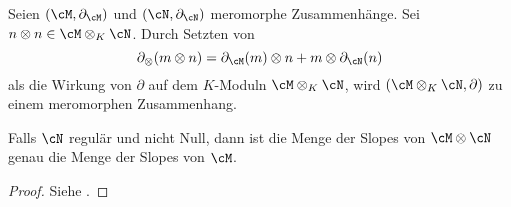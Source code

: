\begin{prop} \label{prop:tensorZusammenhang}
Seien $(\cM,\partial_\cM)$ und $(\cN,\partial_\cN)$ meromorphe Zusammenhänge.
Sei $n\otimes n\in \cM\otimes_K\cN$.
Durch Setzten von
\begin{equation} \label{eq:TensorAbleiten}
\partial_\otimes(m\otimes n)=\partial_\cM(m)\otimes n +m\otimes \partial_\cN(n)
\end{equation}
als die Wirkung von $\partial$ auf dem $K$-Moduln $\cM\otimes_K\cN$, wird
$(\cM\otimes_K\cN,\partial)$ zu einem meromorphen Zusammenhang.
\begin{comment}
\cite[Prop 4.1.1]{SchneidersDmod}
\end{comment}
\end{prop}
\begin{comment}
TODO: Zeige universelle Eigenschaft
\end{comment}
\begin{comment}
\begin{proof}
Klar
\end{proof}
\end{comment}
\begin{lem} 
Falls $\cN$ regulär und nicht Null, dann ist die Menge der Slopes von
$\cM\otimes\cN$ genau die Menge der Slopes von $\cM$.
\end{lem}
\begin{proof}
Siehe \cite[Ex 5.3.7]{sabbah_cimpa90}.
\begin{comment}
TODO
\end{comment}
\end{proof}

